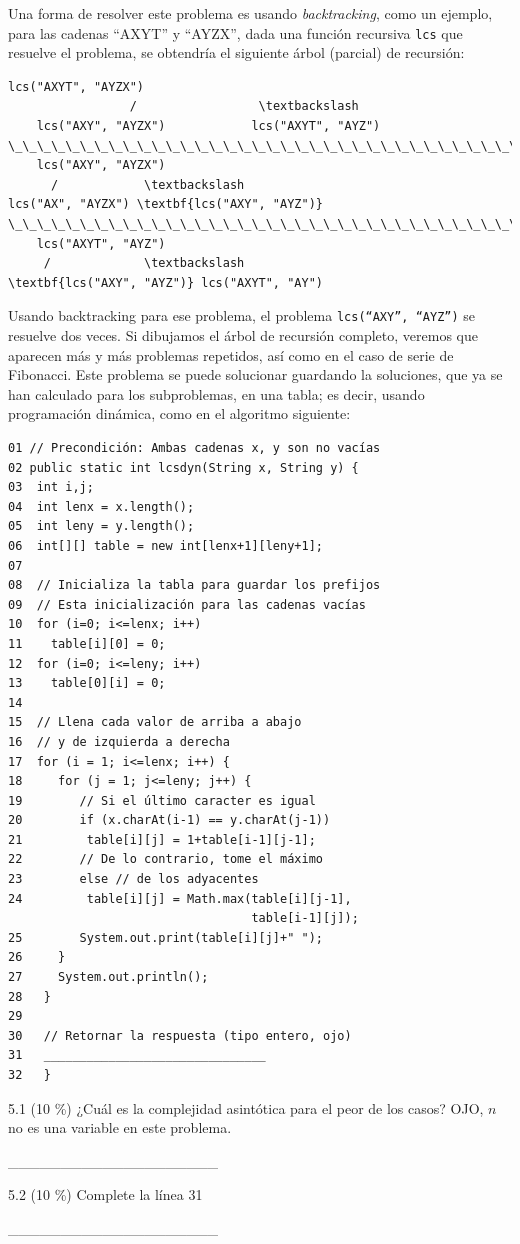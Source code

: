 \documentclass[twocolumn]{article}
\begin{document}
Una forma de resolver este problema es usando \emph{backtracking}, como un ejemplo, para las cadenas  ``AXYT'' y  ``AYZX'', dada una función recursiva \texttt{lcs} 
que resuelve el problema, se obtendría el siguiente árbol (parcial) de recursión:

{\scriptsize
\begin{Verbatim}[commandchars=\\\{\},codes={\catcode`$=3\catcode`_=8}]
                 lcs("AXYT", "AYZX")
                 /                 \textbackslash
    lcs("AXY", "AYZX")            lcs("AXYT", "AYZ")
\_\_\_\_\_\_\_\_\_\_\_\_\_\_\_\_\_\_\_\_\_\_\_\_\_\_\_\_\_\_\_\_\_\_\_\_\_\_\_\_\_\_\_\_\_\_\_\_\_\_\_
    lcs("AXY", "AYZX")          
      /            \textbackslash               
lcs("AX", "AYZX") \textbf{lcs("AXY", "AYZ")}
\_\_\_\_\_\_\_\_\_\_\_\_\_\_\_\_\_\_\_\_\_\_\_\_\_\_\_\_\_\_\_\_\_\_\_\_\_\_\_\_\_\_\_\_\_\_\_\_\_\_\_\_
    lcs("AXYT", "AYZ")
     /             \textbackslash
\textbf{lcs("AXY", "AYZ")} lcs("AXYT", "AY")
\end{Verbatim}
}

Usando backtracking para ese problema, el problema \texttt{lcs(“AXY”, “AYZ”)} se resuelve dos veces. Si dibujamos el árbol de recursión completo, veremos que aparecen más y más problemas repetidos, así como en el caso de serie de Fibonacci. Este problema se puede solucionar guardando la soluciones, que ya se han calculado para los subproblemas, en una tabla; es decir,
usando programación dinámica, como en el algoritmo siguiente:

{\footnotesize
\begin{verbatim}
01 // Precondición: Ambas cadenas x, y son no vacías
02 public static int lcsdyn(String x, String y) {
03  int i,j;
04  int lenx = x.length();
05  int leny = y.length();
06  int[][] table = new int[lenx+1][leny+1];
07 
08  // Inicializa la tabla para guardar los prefijos
09  // Esta inicialización para las cadenas vacías
10  for (i=0; i<=lenx; i++) 
11    table[i][0] = 0;
12  for (i=0; i<=leny; i++)
13    table[0][i] = 0;
14     
15  // Llena cada valor de arriba a abajo
16  // y de izquierda a derecha
17  for (i = 1; i<=lenx; i++) {
18     for (j = 1; j<=leny; j++) {
19        // Si el último caracter es igual
20        if (x.charAt(i-1) == y.charAt(j-1))
21         table[i][j] = 1+table[i-1][j-1];
22        // De lo contrario, tome el máximo
23        else // de los adyacentes
24         table[i][j] = Math.max(table[i][j-1], 
                                  table[i-1][j]);      
25        System.out.print(table[i][j]+" ");
26     }
27     System.out.println();
28   }
29       
30   // Retornar la respuesta (tipo entero, ojo)
31   _______________________________
32   }
\end{verbatim}
}

5.1 (10 \%) ¿Cuál es la complejidad asintótica para el peor de los casos? OJO, $n$ no es una variable en este problema.

  \_\_\_\_\_\_\_\_\_\_\_\_\_\_\_\_\_\_\_\_


5.2 (10 \%) Complete la línea 31

  \_\_\_\_\_\_\_\_\_\_\_\_\_\_\_\_\_\_\_\_

%
\end{document}

